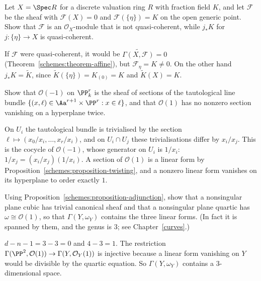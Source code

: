 \begin{exercise}\label{schemes:exercise-not-quasi-coherent}
Let $X = \Spec R$ for a discrete valuation ring $R$ with fraction field $K$, and let $\mathcal{F}$ be the sheaf with $\mathcal{F}(X) = 0$ and $\mathcal{F}(\{\eta\}) = K$ on
the open generic point. Show that $\mathcal{F}$ is an $\mathcal{O}_X$-module that is not quasi-coherent, while $j_*K$ for $j \colon \{\eta\} \to X$ is quasi-coherent.
\end{exercise}

\begin{solution}
If $\mathcal{F}$ were quasi-coherent, it would be $\widetilde{\Gamma(X, \mathcal{F})} = 0$ (Theorem~\ref{schemes:theorem-affine}), but $\mathcal{F}_\eta = K \neq 0$.
On the other hand $j_*K = \widetilde K$, since $\widetilde K(\{\eta\}) = K_{(0)} = K$ and $\widetilde K(X) = K$.
\end{solution}

\begin{exercise}\label{schemes:exercise-o-minus-one}
Show that $\mathcal{O}(-1)$ on $\PP^r_k$ is the sheaf of sections of the tautological line bundle
$\{(x, \ell) \in \Aa^{r+1} \times \PP^r : x \in \ell\}$, and that $\mathcal{O}(1)$ has no nonzero section vanishing on a hyperplane twice.
\end{exercise}

\begin{solution}
On $U_i$ the tautological bundle is trivialised by the section $\ell \mapsto (x_0/x_i, \ldots, x_r/x_i)$, and on $U_i \cap U_j$ these trivialisations differ by
$x_i/x_j$. This is the cocycle of $\mathcal{O}(-1)$, whose generator on $U_i$ is $1/x_i$: $1/x_j = (x_i/x_j)(1/x_i)$. A section of $\mathcal{O}(1)$ is a linear form
by Proposition~\ref{schemes:proposition-twisting}, and a nonzero linear form vanishes on its hyperplane to order exactly $1$.
\end{solution}

\begin{exercise}\label{schemes:exercise-canonical-curves}
Using Proposition~\ref{schemes:proposition-adjunction}, show that a nonsingular plane cubic has trivial canonical sheaf and that a nonsingular plane
quartic has $\omega \cong \mathcal{O}(1)$, so that $\Gamma(Y, \omega_Y)$ contains the three linear forms. (In fact it is spanned by them, and the genus is
$3$; see Chapter~\ref{curves}.)
\end{exercise}

\begin{solution}
$d - n - 1 = 3 - 3 = 0$ and $4 - 3 = 1$. The restriction $\Gamma(\PP^2, \mathcal{O}(1)) \to \Gamma(Y, \mathcal{O}_Y(1))$ is injective because a linear form vanishing on $Y$
would be divisible by the quartic equation. So $\Gamma(Y, \omega_Y)$ contains a $3$-dimensional space.
\end{solution}

